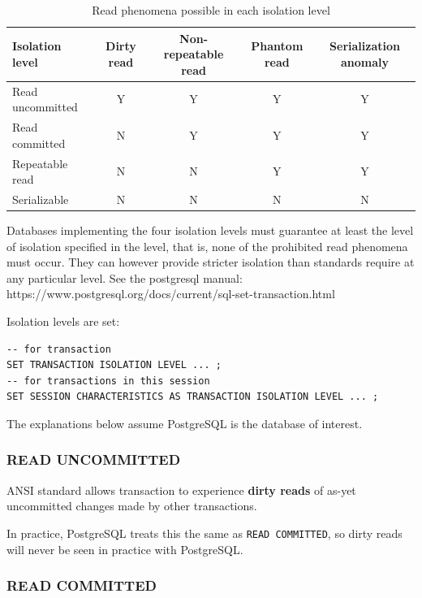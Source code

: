 \begin{table}[htbp]
  \centering
  \begin{tabular}{l c c c c}
    \toprule
    \textbf{Isolation level} & \textbf{Dirty read} & \textbf{Non-repeatable read} & \textbf{Phantom read} & \textbf{Serialization anomaly} \\
    \midrule
    Read uncommitted & Y & Y & Y & Y \\
    Read committed & N & Y & Y & Y \\
    Repeatable read & N & N & Y & Y \\
    Serializable & N & N & N & N \\
    \bottomrule
  \end{tabular}
  \caption{Read phenomena possible in each isolation level}
  \label{tab:read-phenomena-vs-isolation-level}
\end{table}

Databases implementing the four isolation levels must guarantee at least the level of isolation specified in the level, that is, none of the prohibited read phenomena must occur.
They can however provide stricter isolation than standards require at any particular level.
See the postgresql manual:\\
https://www.postgresql.org/docs/current/sql-set-transaction.html

Isolation levels are set:
\begin{verbatim}
-- for transaction 
SET TRANSACTION ISOLATION LEVEL ... ;
-- for transactions in this session
SET SESSION CHARACTERISTICS AS TRANSACTION ISOLATION LEVEL ... ; 
\end{verbatim}
The explanations below assume PostgreSQL is the database of interest.


\subsubsection{READ UNCOMMITTED}

ANSI standard allows transaction to experience \textbf{dirty reads} of as-yet uncommitted changes made by other transactions.

In practice, PostgreSQL treats this the same as \texttt{READ COMMITTED}, so dirty reads will never be seen in practice with PostgreSQL.



\subsubsection{READ COMMITTED}

